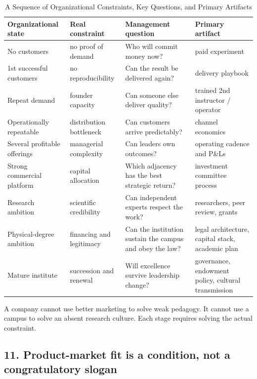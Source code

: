 \begin{table}[t]
\centering
\small
\caption{A Sequence of Organizational Constraints, Key Questions, and Primary Artifacts}
\label{tab:ch36_constraints_sequence}
\begin{tabularx}{\textwidth}{p{2.6cm} p{3.2cm} p{4.5cm} X}
\toprule
\textbf{ Organizational state } & \textbf{ Real constraint } & \textbf{ Management question } & \textbf{ Primary artifact } \\
\midrule
 No customers  &  no proof of demand  &  Who will commit money now?  &  paid experiment  \\
 1st successful customers  &  no reproducibility  &  Can the result be delivered again?  &  delivery playbook  \\
 Repeat demand  &  founder capacity  &  Can someone else deliver quality?  &  trained 2nd instructor / operator  \\
 Operationally repeatable  &  distribution bottleneck  &  Can customers arrive predictably?  &  channel economics  \\
 Several profitable offerings  &  managerial complexity  &  Can leaders own outcomes?  &  operating cadence and P\&Ls  \\
 Strong commercial platform  &  capital allocation  &  Which adjacency has the best strategic return?  &  investment committee process  \\
 Research ambition  &  scientific credibility  &  Can independent experts respect the work?  &  researchers, peer review, grants  \\
 Physical-degree ambition  &  financing and legitimacy  &  Can the institution sustain the campus and obey the law?  &  legal architecture, capital stack, academic plan  \\
 Mature institute  &  succession and renewal  &  Will excellence survive leadership change?  &  governance, endowment policy, cultural transmission  \\
\bottomrule
\end{tabularx}
\end{table}

A company cannot use better marketing to solve weak pedagogy. It cannot use a campus to solve an absent research culture. Each stage requires solving the actual constraint.

\subsection{11. Product-market fit is a condition, not a congratulatory slogan}

